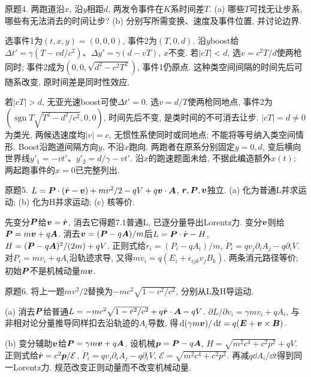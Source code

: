 \begin{exercise}
原题4. 两跑道沿$x$, 沿$y$相距$d$, 两发令事件在$K$系时间差$T$. (a) 哪些$T$可找无让步系, 哪些有无法消去的时间让步? (b) 分别写所需变换、速度及事件位置, 并讨论边界.
\end{exercise}
\begin{solution}
选事件1为$(t,x,y)=(0,0,0)$, 事件2为$(T,0,d)$. 沿$y$boost给$\Delta t'=\gamma(T-vd/c^2)$、$\Delta y'=\gamma(d-vT)$, $x$不变. 若$|cT|<d$, 选$v=c^2T/d$使两枪同时; 事件2成为$(0,0,\sqrt{d^2-c^2T^2})$, 事件1仍原点. 这种类空间间隔的时间先后可随系改变, 原时间差是同时性效应.

若$|cT|>d$, 无亚光速boost可使$\Delta t'=0$. 选$v=d/T$使两枪同地点, 事件2为$(\operatorname{sgn}T\sqrt{T^2-d^2/c^2},0,0)$, 时间先后不变, 是类时间的不可消去让步. $|cT|=d\ne0$为类光, 两候选速度均$|v|=c$, 无惯性系使同时或同地点; 不能将等号纳入类空间情形. Boost沿跑道间隔方向$y$, 不沿$x$跑向. 两跑者在原系分别固定$y=0,d$, 变后横向世界线$y'_1=-vt'$、$y'_2=d/\gamma-vt'$. 沿$x$的跑速题面未给, 不据此编造额外$x(t)$; 两起跑事件的$x=0$已完整列出.
\end{solution}
\begin{exercise}
原题5. $L=\boldsymbol{P}\cdot(\dot{\boldsymbol{r}}-\boldsymbol{v})+mv^2/2-qV+q\boldsymbol{v}\cdot\boldsymbol{A}$, $\boldsymbol{r},\boldsymbol{P},\boldsymbol{v}$独立. (a) 化为普通L并求运动; (b) 化为H并求运动; (c) 核等价.
\end{exercise}
\begin{solution}
先变分$\boldsymbol{P}$给$\boldsymbol{v}=\dot{\boldsymbol{r}}$, 消去它得题7.1普通L, 已逐分量导出Lorentz力. 变分$\boldsymbol{v}$则给$\boldsymbol{P}=m\boldsymbol{v}+q\boldsymbol{A}$. 消去$\boldsymbol{v}=(\boldsymbol{P}-q\boldsymbol{A})/m$后$L=\boldsymbol{P}\cdot\dot{\boldsymbol{r}}-H$, $H=(\boldsymbol{P}-q\boldsymbol{A})^2/(2m)+qV$. 正则式给$\dot r_i=(P_i-qA_i)/m$, $\dot P_i=qv_j\partial_iA_j-q\partial_iV$. 对$P_i=mv_i+qA_i$沿轨迹求导, 又得$m\dot v_i=q(E_i+\epsilon_{ijk}v_jB_k)$. 两条消元路径等价; 初始$\boldsymbol{P}$不是机械动量$m\boldsymbol{v}$.
\end{solution}
\begin{exercise}
原题6. 将上一题$mv^2/2$替换为$-mc^2\sqrt{1-v^2/c^2}$, 分别从L及H导运动.
\end{exercise}
\begin{solution}
(a) 消去$\boldsymbol{P}$给普通$L=-mc^2\sqrt{1-\dot r^2/c^2}+q\dot{\boldsymbol{r}}\cdot\boldsymbol{A}-qV$. $\partial L/\partial v_i=\gamma mv_i+qA_i$, 与非相对论分量推导同样扣去沿轨迹的$A_i$导数, 得$\,\mathrm d(\gamma m\boldsymbol{v})/\,\mathrm d t=q(\boldsymbol{E}+\boldsymbol{v}\times\boldsymbol{B})$.

(b) 变分辅助$\boldsymbol{v}$给$\boldsymbol{P}=\gamma m\boldsymbol{v}+q\boldsymbol{A}$. 设机械$\boldsymbol{p}=\boldsymbol{P}-q\boldsymbol{A}$, $H=\sqrt{m^2c^4+c^2p^2}+qV$. 正则式给$\dot{\boldsymbol{r}}=c^2\boldsymbol{p}/\mathcal E$, $\dot P_i=qv_j\partial_iA_j-q\partial_iV$, $\mathcal E=\sqrt{m^2c^4+c^2p^2}$. 再减$q\dd A_i/\dd t$得到同一Lorentz力. 规范改变正则动量而不改变机械动量.
\end{solution}
